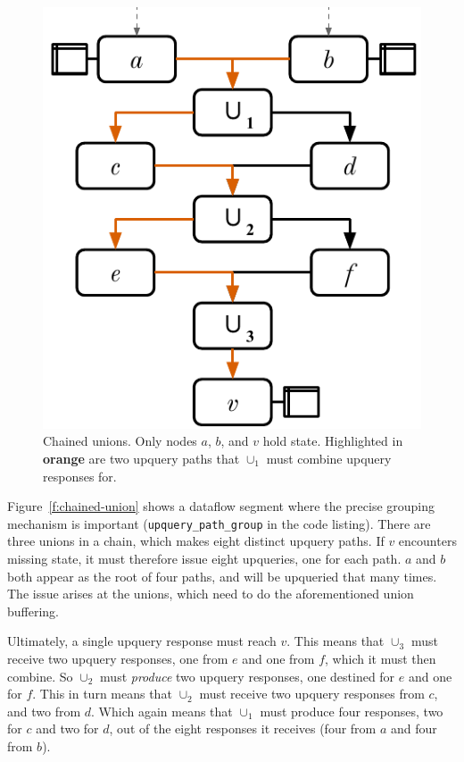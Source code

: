 \begin{figure}[t]
  \centering
  \includegraphics{diagrams/Chained Unions.pdf}
  \caption{Chained unions. Only nodes $a$, $b$, and $v$ hold state. Highlighted
  in \textbf{\color{brewerorange}orange} are two upquery paths that $\cup_1$
  must combine upquery responses for.}
  \label{f:chained-union}
\end{figure}

Figure~\vref{f:chained-union} shows a dataflow segment where the precise grouping
mechanism is important (\texttt{upquery\_path\_group} in the code listing).
There are three unions in a chain, which makes eight distinct upquery paths. If
$v$ encounters missing state, it must therefore issue eight upqueries, one for
each path. $a$ and $b$ both appear as the root of four paths, and will be
upqueried that many times. The issue arises at the unions, which need to do
the aforementioned union buffering.

Ultimately, a single upquery response must reach $v$. This means that $\cup_3$
must receive two upquery responses, one from $e$ and one from $f$, which it must
then combine. So $\cup_2$ must \emph{produce} two upquery responses, one
destined for $e$ and one for $f$. This in turn means that $\cup_2$ must receive
two upquery responses from $c$, and two from $d$. Which again means that
$\cup_1$ must produce four responses, two for $c$ and two for $d$, out of the
eight responses it receives (four from $a$ and four from $b$).

